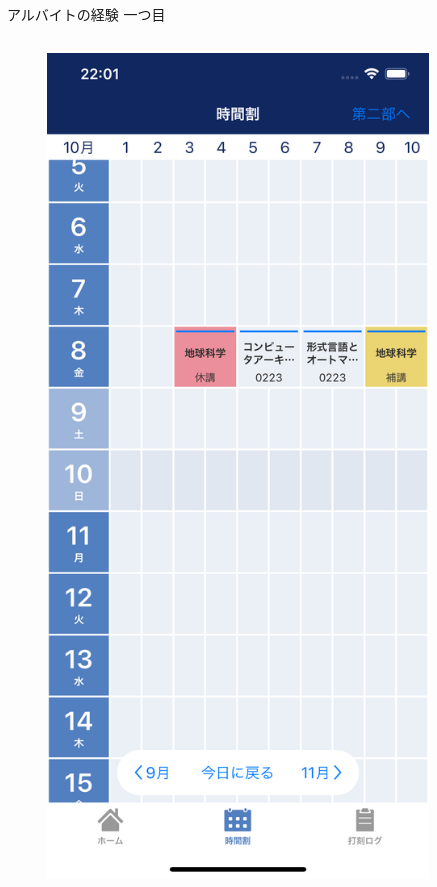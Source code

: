 \documentclass[12pt, unicode]{beamer}
\begin{document}
\begin{frame}{アルバイトの経験 一つ目}
\begin{columns}
    \begin{column}{0.3\textwidth}
      \begin{figure}[h]
        \centering
        \includegraphics[width=0.9\textwidth]{pictures/PyrrolineLecture.png}
      \end{figure}
    \end{column}


\end{columns}
\end{frame}
\end{document}
